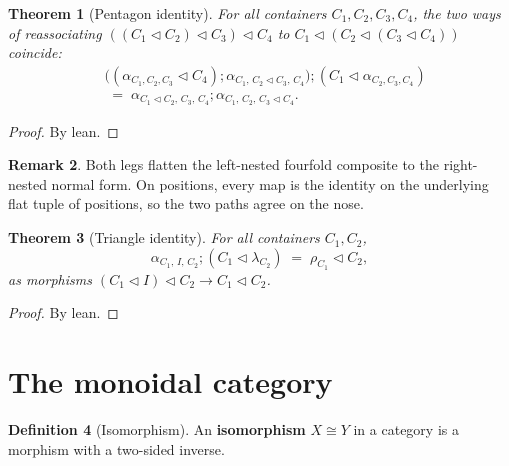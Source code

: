 \documentclass[11pt,a4paper]{article}
\theoremstyle{plain}
\newtheorem{theorem}{Theorem}[section]
\theoremstyle{definition}
\newtheorem{definition}[theorem]{Definition}
\newtheorem{remark}[theorem]{Remark}
\newcommand{\seq}{\mathbin{\triangleleft}}
\begin{document}
\begin{theorem}[Pentagon identity]\label{thm:pentagon}
For all containers $C_1,C_2,C_3,C_4$, the two ways of reassociating
$((C_1 \seq C_2) \seq C_3) \seq C_4$ to
$C_1 \seq (C_2 \seq (C_3 \seq C_4))$ coincide:
\begin{equation}
\begin{aligned}
  &\bigl(
    (\alpha_{C_1,C_2,C_3} \seq C_4)
    \mathbin{;}
    \alpha_{C_1,\, C_2 \seq C_3,\, C_4}
  \bigr)
  \mathbin{;}
  (C_1 \seq \alpha_{C_2,C_3,C_4})
  \\
  &\;=\;
  \alpha_{C_1 \seq C_2,\, C_3,\, C_4}
  \mathbin{;}
  \alpha_{C_1,\, C_2,\, C_3 \seq C_4}.
\end{aligned}
\end{equation}
\end{theorem}

\begin{proof}
By lean.
\end{proof}

\begin{remark}
Both legs flatten the left-nested fourfold composite to the right-nested
normal form. On positions, every map is the identity on the underlying
flat tuple of positions, so the two paths agree on the nose.
\end{remark}

\begin{theorem}[Triangle identity]\label{thm:triangle}
For all containers $C_1,C_2$,
\begin{equation}
  \alpha_{C_1,\, I,\, C_2}
  \mathbin{;}
  (C_1 \seq \lambda_{C_2})
  \;=\;
  \rho_{C_1} \seq C_2,
\end{equation}
as morphisms $(C_1 \seq I) \seq C_2 \to C_1 \seq C_2$.
\end{theorem}

\begin{proof}
By lean.
\end{proof}

\section{The monoidal category}

\begin{definition}[Isomorphism]\label{def:iso}
An \textbf{isomorphism} $X \cong Y$ in a category is a morphism with a
two-sided inverse.
\end{definition}
\end{document}
